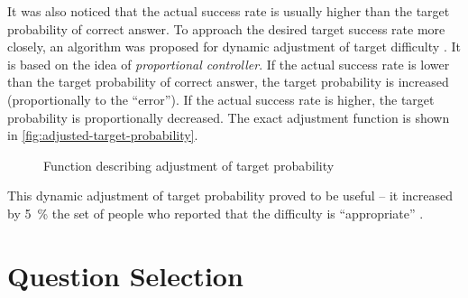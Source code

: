 \documentclass[12pt, twoside]{fithesis2}		%
\renewcommand{\_}{\leavevmode \kern0.07em\vbox{\hrule width0.4em}}
\begin{document}
It was also noticed that the actual success rate is usually higher than the target probability of correct answer.
To approach the desired target success rate more closely, an algorithm was proposed for dynamic adjustment of target difficulty \cite{slepe-mapy-motivation}.
It is based on the idea of \textit{proportional controller}.
If the actual success rate is lower than the target probability of correct answer, the target probability is increased (proportionally to the ``error'').
If the actual success rate is higher, the target probability is proportionally decreased.
The exact adjustment function is shown in \autoref{fig:adjusted-target-probability}.

\begin{figure}[h]
  \centering
  \caption{Function describing adjustment of target probability}
  \label{fig:adjusted-target-probability}
\end{figure}

This dynamic adjustment of target probability proved to be useful -- it increased by 5~\% the set of people who reported that the difficulty is ``appropriate'' \cite{slepe-mapy-motivation}.


\section{Question Selection}
\label{sec:question-selection}
\end{document}
